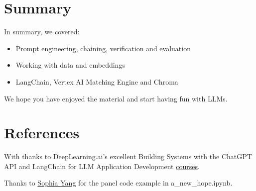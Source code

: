 \documentclass[
  letterpaper,
  DIV=11,
  numbers=noendperiod]{scrreprt}
\newlength{\cslhangindent}
\newlength{\cslentryspacingunit} %
\newenvironment{CSLReferences}[2] %
 {%
  \setlength{\parindent}{0pt}
  \ifodd #1
  \let\oldpar\par
  \def\par{\hangindent=\cslhangindent\oldpar}
  \fi
  \setlength{\parskip}{#2\cslentryspacingunit}
 }%
 {}
\begin{document}

\hypertarget{summary}{%
\chapter{Summary}\label{summary}}

In summary, we covered:

\begin{itemize}
\item
  Prompt engineering, chaining, verification and evaluation
\item
  Working with data and embeddings
\item
  LangChain, Vertex AI Matching Engine and Chroma
\end{itemize}

We hope you have enjoyed the material and start having fun with LLMs.


\hypertarget{references}{%
\chapter*{References}\label{references}}


\hypertarget{refs}{}
\begin{CSLReferences}{0}{0}
\end{CSLReferences}

With thanks to DeepLearning.ai's excellent Building Systems with the
ChatGPT API and LangChain for LLM Application Development
\href{https://www.deeplearning.ai/short-courses/}{courses}.

Thanks to
\href{https://github.com/sophiamyang/tutorials-LangChain}{Sophia Yang}
for the panel code example in a\_new\_hope.ipynb.
\end{document}
